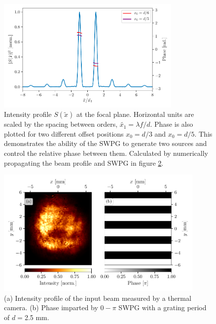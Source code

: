 \begin{figure}
	\centering
	\includegraphics[width=0.8\textwidth]{figures/Two_source/intensity_and_phase.pdf}
	\caption{Intensity profile $S(\tilde{x})$ at the focal plane. Horizontal units are scaled by the spacing between orders, $\tilde{x_1}=\lambda f/d$.  Phase is also plotted for two different offset positions $x_0=d/3$ and $x_0=d/5$.  This demonstrates the ability of the SWPG to generate two sources and control the relative phase between them. Calculated by numerically propagating the beam profile and SWPG in figure \ref{fig:LP_inputs}.}
	\label{fig:s^2}
\end{figure}
\begin{figure}
	\centering
	\includegraphics[width=0.9\textwidth]{figures/Two_source/LP_images.pdf}
	\caption{(a) Intensity profile of the input beam measured by a thermal camera. (b) Phase imparted by $0-\pi$ SWPG with a grating period of $d=$2.5 mm.}
	\label{fig:LP_inputs}
\end{figure}

